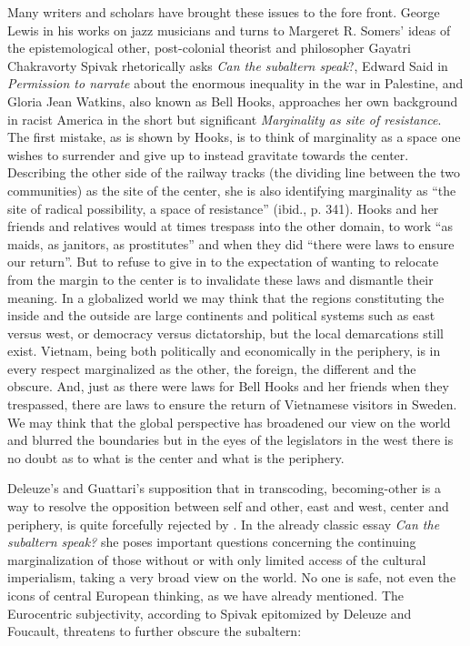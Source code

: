 \documentclass[a4paper]{article}
\begin{document}
Many writers and scholars have brought these issues to the fore front. George Lewis in his works on jazz musicians and turns to Margeret R. Somers' ideas of the epistemological other, post-colonial theorist and philosopher Gayatri Chakravorty Spivak rhetorically asks \emph{Can the subaltern speak}?, Edward Said in \emph{Permission to narrate} about the enormous inequality in the war in Palestine, and Gloria Jean Watkins, also known as Bell Hooks, approaches her own background in racist America in the short but significant \emph{Marginality as site of resistance}\cite{HooksBell1990}. The first mistake, as is shown by Hooks, is to think of marginality as a space one wishes to surrender and give up to instead gravitate towards the center. Describing the other side of the railway tracks (the dividing line between the two communities) as the site of the center, she is also identifying marginality as ``the site of radical possibility, a space of resistance'' (ibid., p. 341). Hooks and her friends and relatives would at times trespass into the other domain, to work ``as maids, as janitors, as prostitutes'' and when they did ``there were laws to ensure our return''. But to refuse to give in to the expectation of wanting to relocate from the margin to the center is to invalidate these laws and dismantle their meaning. In a globalized world we may think that the regions constituting the inside and the outside are large continents and political systems such as east versus west, or democracy versus dictatorship, but the local demarcations still exist. Vietnam, being both politically and economically in the periphery, is in every respect marginalized as the other, the foreign, the different and the obscure. And, just as there were laws for Bell Hooks and her friends when they trespassed, there are laws to ensure the return of Vietnamese visitors in Sweden. We may think that the global perspective has broadened our view on the world and blurred the boundaries but in the eyes of the legislators in the west there is no doubt as to what is the center and what is the periphery. 

Deleuze's and Guattari's supposition that in transcoding, becoming-other is a way to resolve the opposition between self and other, east and west, center and periphery, is quite forcefully rejected by  \citet{spivak1988}. In the already classic essay \emph{Can the subaltern speak?} she poses important questions concerning the continuing marginalization of those without or with only limited access of the cultural imperialism, taking a very broad view on the world. No one is safe, not even the icons of central European thinking, as we have already mentioned. The Eurocentric subjectivity, according to Spivak epitomized by Deleuze and Foucault, threatens to further obscure the subaltern:
\end{document}
